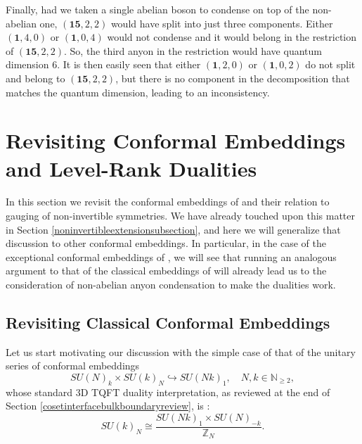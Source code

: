 \documentclass[11pt]{article}
\numberwithin{equation}{section}
\begin{document}
Finally, had we taken a single abelian boson to condense on top of the non-abelian one, $(\mathbf{15},2,2)$ would have split into just three components. Either $(\mathbf{1},4,0)$ or $(\mathbf{1},0,4)$ would not condense and it would belong in the restriction of $(\mathbf{15},2,2)$. So, the third anyon in the restriction would have quantum dimension 6. It is then easily seen that either $(\mathbf{1},2,0)$ or $(\mathbf{1},0,2)$ do not split and belong to $(\mathbf{15},2,2)$, but there is no component in the decomposition that matches the quantum dimension, leading to an inconsistency.


\section{Revisiting Conformal Embeddings and Level-Rank Dualities} \label{conformalembeddings}

In this section we revisit the conformal embeddings of \cite{Hsin:2016blu, Aharony:2016jvv, Cordova:2017vab, Cordova:2018qvg} and their relation to gauging of non-invertible symmetries. We have already touched upon this matter in Section \ref{noninvertibleextensionsubsection}, and here we will generalize that discussion to other conformal embeddings. In particular, in the case of the exceptional conformal embeddings of \cite{Cordova:2018qvg}, we will see that running an analogous argument to that of the classical embeddings of \cite{Hsin:2016blu, Aharony:2016jvv, Cordova:2017vab} will already lead us to the consideration of non-abelian anyon condensation to make the dualities work.

\subsection{Revisiting Classical Conformal Embeddings}

Let us start motivating our discussion with the simple case of that of the unitary series of conformal embeddings
\begin{equation}
    SU(N)_{k} \times SU(k)_{N} \hookrightarrow SU(Nk)_{1}, \quad N,k \in \mathbb{N}_{\geq 2},
\end{equation}
whose standard 3D TQFT duality interpretation, as reviewed at the end of Section \ref{cosetinterfacebulkboundaryreview}, is \cite{Hsin:2016blu}:
\begin{equation} \label{standardunitaryduality}
    SU(k)_{N} \cong \frac{SU(Nk)_{1} \times SU(N)_{-k}}{\mathbb{Z}_{N}}.
\end{equation}
\end{document}
